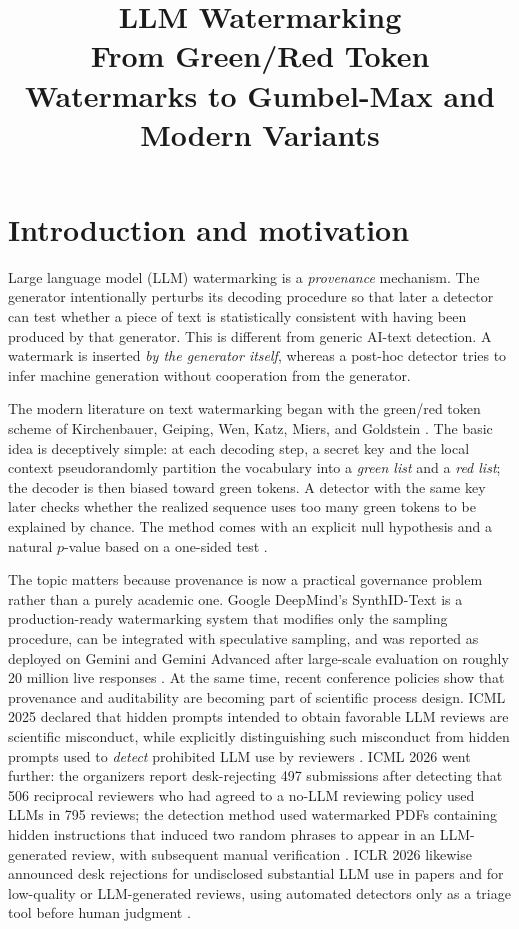 \documentclass[11pt]{article}
\theoremstyle{definition}
\newcommand{\1}{\mathbf{1}}
\begin{document}
\title{LLM Watermarking\\[0.35em]
\large From Green/Red Token Watermarks to Gumbel-Max and Modern Variants}
\author{}
\date{}
\maketitle

\section{Introduction and motivation}

Large language model (LLM) watermarking is a \emph{provenance} mechanism. The generator intentionally perturbs its decoding procedure so that later a detector can test whether a piece of text is statistically consistent with having been produced by that generator. This is different from generic AI-text detection. A watermark is inserted \emph{by the generator itself}, whereas a post-hoc detector tries to infer machine generation without cooperation from the generator.

The modern literature on text watermarking began with the green/red token scheme of Kirchenbauer, Geiping, Wen, Katz, Miers, and Goldstein \cite{kirchenbauer2023watermark}. The basic idea is deceptively simple: at each decoding step, a secret key and the local context pseudorandomly partition the vocabulary into a \emph{green list} and a \emph{red list}; the decoder is then biased toward green tokens. A detector with the same key later checks whether the realized sequence uses too many green tokens to be explained by chance. The method comes with an explicit null hypothesis and a natural $p$-value based on a one-sided test \cite{kirchenbauer2023watermark}.

The topic matters because provenance is now a practical governance problem rather than a purely academic one. Google DeepMind's SynthID-Text is a production-ready watermarking system that modifies only the sampling procedure, can be integrated with speculative sampling, and was reported as deployed on Gemini and Gemini Advanced after large-scale evaluation on roughly 20 million live responses \cite{dathathri2024synthid,deepmind2024blog}. At the same time, recent conference policies show that provenance and auditability are becoming part of scientific process design. ICML 2025 declared that hidden prompts intended to obtain favorable LLM reviews are scientific misconduct, while explicitly distinguishing such misconduct from hidden prompts used to \emph{detect} prohibited LLM use by reviewers \cite{icml2025ethics}. ICML 2026 went further: the organizers report desk-rejecting 497 submissions after detecting that 506 reciprocal reviewers who had agreed to a no-LLM reviewing policy used LLMs in 795 reviews; the detection method used watermarked PDFs containing hidden instructions that induced two random phrases to appear in an LLM-generated review, with subsequent manual verification \cite{icml2026violations,icml2026faq,icml2026policy}. ICLR 2026 likewise announced desk rejections for undisclosed substantial LLM use in papers and for low-quality or LLM-generated reviews, using automated detectors only as a triage tool before human judgment \cite{iclr2026response,iclr2026authorguide}.
\end{document}
